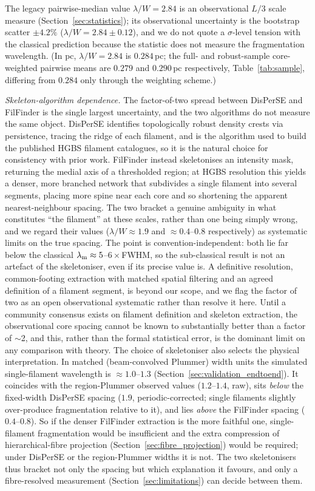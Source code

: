 \documentclass[usenatbib,twoside,twocolumn]{mnras}
\begin{document}
The legacy pairwise-median value $\lambda/W=2.84$ is an observational $L/3$ scale measure (Section~\ref{sec:statistics}); its observational uncertainty is the bootstrap scatter $\pm4.2\%$ ($\lambda/W=2.84\pm0.12$), and we do not quote a $\sigma$-level tension with the classical prediction because the statistic does not measure the fragmentation wavelength. (In pc, $\lambda/W=2.84$ is $0.284$\,pc; the full- and robust-sample core-weighted pairwise means are $0.279$ and $0.290$\,pc respectively, Table~\ref{tab:sample}, differing from $0.284$ only through the weighting scheme.)

\emph{Skeleton-algorithm dependence.} The factor-of-two spread between DisPerSE and FilFinder is the single largest uncertainty, and the two algorithms do not measure the same object. DisPerSE identifies topologically robust density crests via persistence, tracing the ridge of each filament, and is the algorithm used to build the published HGBS filament catalogues, so it is the natural choice for consistency with prior work. FilFinder instead skeletonises an intensity mask, returning the medial axis of a thresholded region; at HGBS resolution this yields a denser, more branched network that subdivides a single filament into several segments, placing more spine near each core and so shortening the apparent nearest-neighbour spacing. The two bracket a genuine ambiguity in what constitutes ``the filament'' at these scales, rather than one being simply wrong, and we regard their values ($\lambda/W\approx1.9$ and $\approx0.4$--$0.8$ respectively) as systematic limits on the true spacing. The point is convention-independent: both lie far below the classical $\lambda_{\rm m}\approx5$--$6\times$FWHM, so the sub-classical result is not an artefact of the skeletoniser, even if its precise value is. A definitive resolution, common-footing extraction with matched spatial filtering and an agreed definition of a filament segment, is beyond our scope, and we flag the factor of two as an open observational systematic rather than resolve it here. Until a community consensus exists on filament definition and skeleton extraction, the observational core spacing cannot be known to substantially better than a factor of $\sim$2, and this, rather than the formal statistical error, is the dominant limit on any comparison with theory. The choice of skeletoniser also selects the physical interpretation. In matched (beam-convolved Plummer) width units the simulated single-filament wavelength is $\approx1.0$--$1.3$ (Section~\ref{sec:validation_endtoend}). It coincides with the region-Plummer observed values ($1.2$--$1.4$, raw), sits \emph{below} the fixed-width DisPerSE spacing ($1.9$, periodic-corrected; single filaments slightly over-produce fragmentation relative to it), and lies \emph{above} the FilFinder spacing ($0.4$--$0.8$). So if the denser FilFinder extraction is the more faithful one, single-filament fragmentation would be insufficient and the extra compression of hierarchical-fibre projection (Section~\ref{sec:fibre_projection}) would be required; under DisPerSE or the region-Plummer widths it is not. The two skeletonisers thus bracket not only the spacing but which explanation it favours, and only a fibre-resolved measurement (Section~\ref{sec:limitations}) can decide between them.
\end{document}
